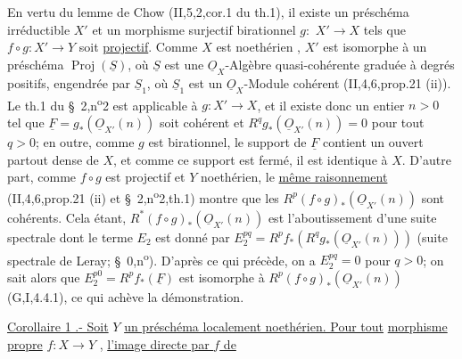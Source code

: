 En vertu du lemme de Chow (II,5,2,cor.1 du th.1), il existe un
préschéma irréductible $X'$ et un morphisme  surjectif  birationnel $g:$
$X'\to X$ tels que $f\circ g:X'\to Y$ soit \uline{projectif}. Comme $X$ est noethérien
,
$X'$ est isomorphe à un
préschéma $\operatorname{Proj}(\underline S)$, où $\underline S$ est une $\underline O_X$-Algèbre  quasi-cohérente
graduée à degrés positifs, engendrée par $\underline S_1$, où $\underline S_1$ est un $\underline O_X$-Module
cohérent (II,4,6,prop.21 (ii)). Le th.1 du \S\ 2,n\textsuperscript{o}2 est applicable
à $g:X'\to X$, et il existe donc un entier $n>0$ tel que 
$\underline F=g_*(\underline O_{X'}(n))$ soit cohérent et $R^qg_*(\underline O_{X'}(n))=0$ pour tout $q>0$; en outre,
comme $g$ est birationnel, le support de $\underline F$ contient un ouvert
partout dense de $X$, et comme ce support est fermé, il est identique
à $X$. D'autre part, comme $f\circ g$ est projectif et $Y$ noethérien,
le \uline{même raisonnement} (II,4,6,prop.21 (ii) et \S\ 2,n\textsuperscript{o}2,th.1) montre
que les $R^p(f\circ g)_*(\underline O_{X'}(n))$ sont cohérents. Cela étant, 
$R^*(f\circ g)_*(\underline O_{X'}(n))$ est l'aboutissement d'une suite spectrale dont le
terme $E_2$ est donné par $E_2^{pq}=R^pf_*(R^qg_*(\underline O_{X'}(n)))$ (suite spectrale de
Leray; \S\ 0,n\textsuperscript{o}\quad). D'après ce qui précède, on a $E_2^{pq}=0$ pour $q>0$;
on sait alors que  $E_2^{p0}=R^pf_*(\underline F)$ est isomorphe à $R^p(f\circ g)_*(\underline O_{X'}(n))$
(G,I,4.4.1), ce qui achève la démonstration.

\uline{Corollaire 1 .- Soit} $Y$ \uline{un préschéma localement noethérien. Pour tout}
\uline{morphisme propre} $f:X\to Y$ , \uline{l'image directe par $f$ de}

